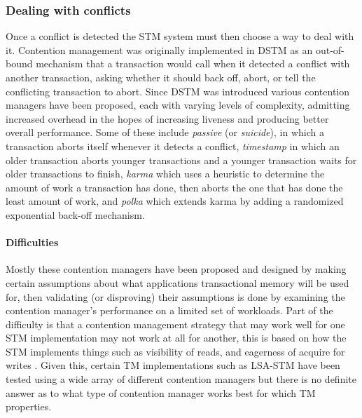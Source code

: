 \subsubsection{Dealing with conflicts}\label{sec:intro-contention}
Once a conflict is detected the STM system must then choose a way to deal with it.
Contention management was originally implemented in DSTM \cite{HLMS03} as an out-of-bound mechanism
that a transaction would call when it detected a conflict with another transaction, 
asking whether it should back off, abort, or tell the conflicting transaction to abort.
Since DSTM was introduced various contention managers have been proposed, each with varying 
levels of complexity, admitting increased overhead in the hopes of increasing liveness and producing better overall performance.
Some of these include \cite{SS04} \emph{passive} (or \emph{suicide}), in which a transaction aborts itself
 whenever it detects a conflict, \emph{timestamp} in which an older transaction aborts younger
 transactions and a younger transaction waits for older transactions to finish, \emph{karma} which
 uses a heuristic to determine the amount of work a transaction has done, then aborts the one that
 has done the least amount of work, and \emph{polka} \cite{1073861} which extends karma by adding a randomized exponential back-off mechanism.

\paragraph{Difficulties}
Mostly these contention managers have been proposed and designed by making certain assumptions about
 what applications transactional memory will be used for, then validating (or disproving) their assumptions is done
by examining the contention manager's performance on a limited set of workloads.
Part of the difficulty is that a contention management strategy that may work well for one STM 
implementation may not work at all for another, this is based on how the STM implements things such as
 visibility of reads, and eagerness of acquire for writes \cite{DGK09}.
Given this, certain TM implementations such as LSA-STM \cite{RFF07} have been tested using a wide array of 
different contention managers  but there is no definite answer as 
to what type of contention manager works best for which TM properties.

